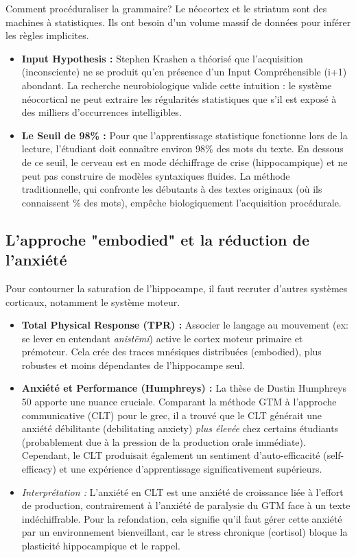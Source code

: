 Comment \og procéduraliser\fg{} la grammaire? Le néocortex et le striatum sont des machines à
statistiques. Ils ont besoin d'un volume massif de données pour inférer les règles implicites.

\begin{itemize}\item \textbf{Input Hypothesis :} Stephen Krashen a théorisé que l'acquisition (inconsciente) ne se produit qu'en présence d'un \og Input Compréhensible\fg{} (i+1) abondant. La recherche neurobiologique valide cette intuition : le système néocortical ne peut extraire les régularités statistiques que s'il est exposé à des milliers d'occurrences intelligibles.\cite{III-3-1-ref6}\item \textbf{Le Seuil de 98\% :} Pour que l'apprentissage statistique fonctionne lors de la lecture, l'étudiant doit connaître environ 98\% des mots du texte. En dessous de ce seuil, le cerveau est en mode \og déchiffrage de crise\fg{} (hippocampique) et ne peut pas construire de modèles syntaxiques fluides. La méthode traditionnelle, qui confronte les débutants à des textes originaux (où ils connaissent \% des mots), empêche biologiquement l'acquisition procédurale.\cite{III-3-1-ref44}\end{itemize}

\subsection{L'approche "embodied" et la réduction de l'anxiété}

Pour contourner la saturation de l'hippocampe, il faut recruter d'autres systèmes corticaux,
notamment le système moteur.

\begin{itemize}\item \textbf{Total Physical Response (TPR) :} Associer le langage au mouvement (ex: se lever en entendant \textit{anistēmi}) active le cortex moteur primaire et prémoteur. Cela crée des traces mnésiques distribuées (embodied), plus robustes et moins dépendantes de l'hippocampe seul.\cite{III-3-1-ref47}\item \textbf{Anxiété et Performance (Humphreys) :} La thèse de Dustin Humphreys 50 apporte une nuance cruciale. Comparant la méthode GTM à l'approche communicative (CLT) pour le grec, il a trouvé que le CLT générait une anxiété débilitante (debilitating anxiety) \textit{plus élevée} chez certains étudiants (probablement due à la pression de la production orale immédiate). Cependant, le CLT produisait également un sentiment d'auto-efficacité (self-efficacy) et une expérience d'apprentissage significativement supérieurs.\item \textit{Interprétation :} L'anxiété en CLT est une \og anxiété de croissance\fg{} liée à l'effort de production, contrairement à l'anxiété de \og paralysie\fg{} du GTM face à un texte indéchiffrable. Pour la refondation, cela signifie qu'il faut gérer cette anxiété par un environnement bienveillant, car le stress chronique (cortisol) bloque la plasticité hippocampique et le rappel.\cite{III-3-1-ref52}\end{itemize}

